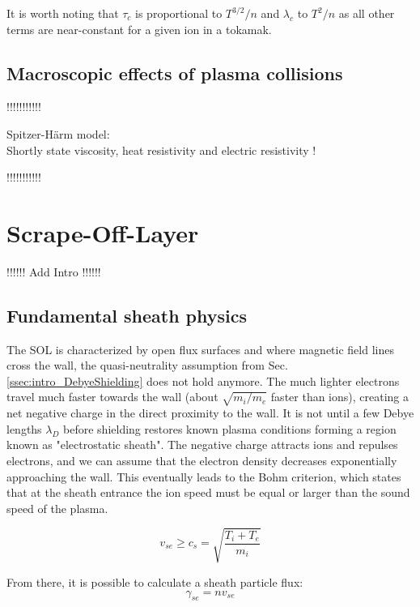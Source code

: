 It is worth noting that $\tau_c$ is proportional to $T^{3/2}/n$ and $\lambda_c$ to $T^2/n$ as all other terms are near-constant for a given ion in a tokamak.


\subsection{Macroscopic effects of plasma collisions}

!!!!!!!!!!!

Spitzer-Härm model: \\

Shortly state viscosity, heat resistivity and electric resistivity ! 

!!!!!!!!!!!




\section{Scrape-Off-Layer}
\label{sec:intro_SOL}

!!!!!!
Add Intro 
!!!!!!


\subsection{Fundamental sheath physics}
\label{sec:intro_sheath}

The SOL is characterized by open flux surfaces and where magnetic field lines cross the wall, the quasi-neutrality assumption from Sec. \ref{ssec:intro_DebyeShielding} does not hold anymore. The much lighter electrons travel much faster towards the wall (about $\sqrt{m_i/m_e}$ faster than ions), creating a net negative charge in the direct proximity to the wall. It is not until a few Debye lengths $\lambda_D$ before shielding restores known plasma conditions forming a region known as "electrostatic sheath". The negative charge attracts ions and repulses electrons, and we can assume that the electron density decreases exponentially approaching the wall. This eventually leads to the Bohm criterion\cite{riemann1991bohm}, which states that at the sheath entrance the ion speed must be equal or larger than the sound speed of the plasma.

\begin{equation}
	\label{eq:intro_BohmCriterion}
	v_{se} \ge c_s = \sqrt{\frac{T_i+T_e}{m_i}}
\end{equation}

From there, it is possible to calculate a sheath particle flux:
\begin{equation}
	\gamma_{se} = nv_{se}
\end{equation}

